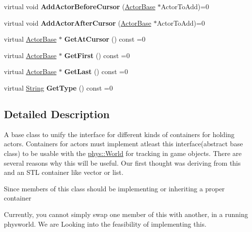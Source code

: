 \begin{DoxyCompactItemize}
\item 
\hypertarget{classphys_1_1ActorContainerBase_aab0633b4859840a4f4ecb42c389fd077}{
virtual void {\bfseries AddActorBeforeCursor} (\hyperlink{classphys_1_1ActorBase}{ActorBase} $\ast$ActorToAdd)=0}
\label{d1/d00/classphys_1_1ActorContainerBase_aab0633b4859840a4f4ecb42c389fd077}

\item 
\hypertarget{classphys_1_1ActorContainerBase_ad7f1992684712a1527dbd51967cca5c7}{
virtual void {\bfseries AddActorAfterCursor} (\hyperlink{classphys_1_1ActorBase}{ActorBase} $\ast$ActorToAdd)=0}
\label{d1/d00/classphys_1_1ActorContainerBase_ad7f1992684712a1527dbd51967cca5c7}

\item 
\hypertarget{classphys_1_1ActorContainerBase_a2c8fb86a9e188aece105b2a753ccc19a}{
virtual \hyperlink{classphys_1_1ActorBase}{ActorBase} $\ast$ {\bfseries GetAtCursor} () const =0}
\label{d1/d00/classphys_1_1ActorContainerBase_a2c8fb86a9e188aece105b2a753ccc19a}

\item 
\hypertarget{classphys_1_1ActorContainerBase_ae703482d84a9c6726e28a8f26418b161}{
virtual \hyperlink{classphys_1_1ActorBase}{ActorBase} $\ast$ {\bfseries GetFirst} () const =0}
\label{d1/d00/classphys_1_1ActorContainerBase_ae703482d84a9c6726e28a8f26418b161}

\item 
\hypertarget{classphys_1_1ActorContainerBase_a8efeffd5ae22085fe01af791b3ea559e}{
virtual \hyperlink{classphys_1_1ActorBase}{ActorBase} $\ast$ {\bfseries GetLast} () const =0}
\label{d1/d00/classphys_1_1ActorContainerBase_a8efeffd5ae22085fe01af791b3ea559e}

\item 
\hypertarget{classphys_1_1ActorContainerBase_a526dab176597858680490d128d0584a3}{
virtual \hyperlink{namespacephys_aa03900411993de7fbfec4789bc1d392e}{String} {\bfseries GetType} () const =0}
\label{d1/d00/classphys_1_1ActorContainerBase_a526dab176597858680490d128d0584a3}

\end{DoxyCompactItemize}


\subsection{Detailed Description}
A base class to unify the interface for different kinds of containers for holding actors. Containers for actors must implement atleast this interface(abstract base class) to be usable with the \hyperlink{classphys_1_1World}{phys::World} for tracking in game objects. There are several reasons why this will be useful. Our first thought was deriving from this and an STL container like vector or list. \par
\par
 Since members of this class should be implementing or inheriting a proper container\par
\par
 Currently, you cannot simply swap one member of this with another, in a running physworld. We are Looking into the feasibility of implementing this. 

